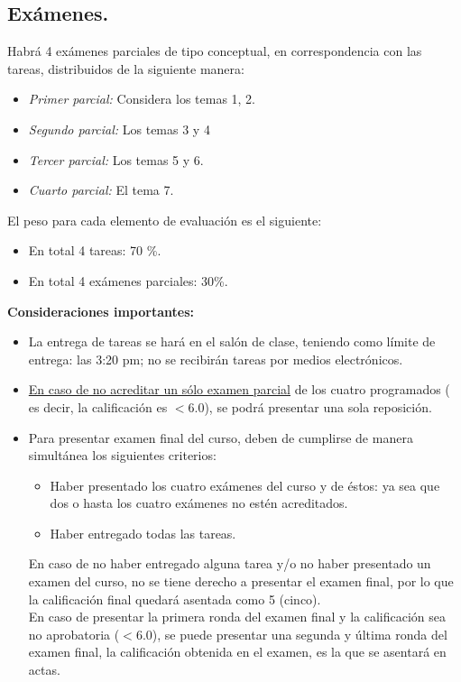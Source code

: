 \documentclass[12pt]{article}
\begin{document}
\subsection{Exámenes.}
Habrá 4 exámenes parciales de tipo conceptual, en correspondencia con las tareas, distribuidos de la siguiente manera:
\begin{itemize}
\item \emph{Primer parcial:} Considera los temas 1, 2.
\item \emph{Segundo parcial:} Los temas 3 y 4
\item \emph{Tercer parcial:} Los temas 5 y 6.
\item \emph{Cuarto parcial:} El tema 7.
\end{itemize}
El peso para cada elemento de evaluación es el siguiente:
\begin{itemize}
\setlength{\itemsep}{0mm}
\item En total 4 tareas: \hspace{2cm} 70 \%.
\item En total 4 exámenes parciales: 30\%.
\end{itemize}
\textbf{Consideraciones importantes:}
\begin{itemize}
\setlength{\itemsep}{0mm}
\item La entrega de tareas se hará en el salón de clase, teniendo como límite de entrega: las 3:20 pm; no se recibirán tareas por medios electrónicos.
\item \underline{En caso de no acreditar un sólo examen parcial} de los cuatro programados ( es decir, la calificación es $<6.0$), se podrá presentar una sola reposición.
\item Para presentar examen final del curso, deben de cumplirse de manera simultánea los siguientes criterios:
\begin{itemize}
\item Haber presentado los cuatro exámenes del curso y de éstos: ya sea que dos o hasta los cuatro exámenes no estén acreditados.
\item Haber entregado todas las tareas.
\end{itemize}  
En caso de no haber entregado alguna tarea y/o no haber presentado un examen del curso, no se tiene derecho a  presentar el examen final, por lo que la calificación final quedará asentada como 5 (cinco).
\\
En caso de presentar la primera ronda del examen final y la calificación sea no aprobatoria ($<6.0$), se puede presentar una segunda y última ronda del examen final, la calificación obtenida en el examen, es la que se asentará en actas.
\end{itemize}
\end{document}

